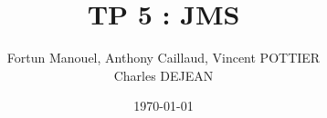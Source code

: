 \documentclass[12pt,a4paper,utf8x]{report}
\title
{
	\Huge{TP 5 : JMS}
}
\author{Fortun Manouel, Anthony Caillaud, Vincent POTTIER\\Charles DEJEAN\\
	\vspace{45mm}
}
\date{	\today }
\begin{document}
\maketitle

%

\tableofcontents
\clearpage

\begin{onehalfspace}







\end{onehalfspace}

% 
%
% 

\printindex

\appendix
\end{document}
